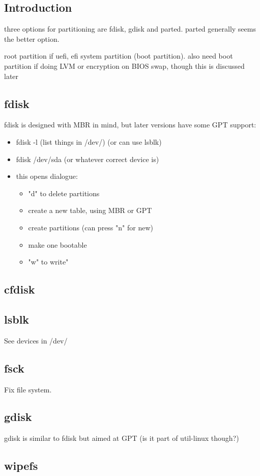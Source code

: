 
\subsection{Introduction}

three options for partitioning are fdisk, gdisk and parted. parted generally seems the better option.


root partition
if uefi, efi system partition (boot partition). also need boot partition if doing LVM or encryption on BIOS
swap, though this is discussed later

\subsection{fdisk}

fdisk is designed with MBR in mind, but later versions have some GPT support:

\begin{itemize}
  \item fdisk -l (list things in /dev/) (or can use lsblk)
  \item fdisk /dev/sda (or whatever correct device is)
  \item this opens dialogue:
  \begin{itemize}
    \item "d" to delete partitions
    \item create a new table, using MBR or GPT
    \item create partitions (can press "n" for new)
    \item make one bootable
    \item "w" to write"
  \end{itemize}
\end{itemize}

\subsection{cfdisk}

\subsection{lsblk}

See devices in /dev/
\subsection{fsck}

Fix file system.

\subsection{gdisk}

gdisk is similar to fdisk but aimed at GPT (is it part of util-linux though?)

\subsection{wipefs}

